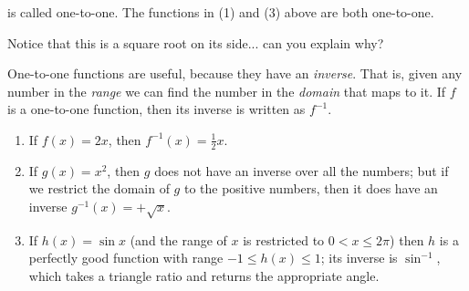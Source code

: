\begin{ex}
\begin{enumerate}
          is called one-to-one. The functions in (1) and (3) above are both one-to-one.
          \begin{center}
          \end{center}
          Notice that this is a square root on its side... can you explain why?
  \end{enumerate}
\end{ex}

One-to-one functions are useful, because they have an \emph{inverse}. That is, given any number in the \emph{range} we can find
the number in the \emph{domain} that maps to it. If $ f $ is a one-to-one function, then its inverse is written as $ f^{-1} $.

\begin{ex}\leavevmode
  \begin{enumerate}
    \item If $ f(x) = 2x $, then $ f^{-1}(x) = \frac{1}{2} x $.
    \item If $ g(x) = x^2 $, then $ g $ does not have an inverse over all the numbers; but if we restrict the domain of $ g $ to
          the positive numbers, then it does have an inverse $ g^{-1}(x) = +\sqrt{x} $.
    \item If $ h(x) = \sin x $ (and the range of $ x $ is restricted to $ 0 < x \leq 2\pi $) then $ h $ is a perfectly good function
          with range $ -1 \leq h(x) \leq 1 $; its inverse is $ \sin^{-1} $, which takes a triangle ratio and returns the appropriate angle.
  \end{enumerate}
\end{ex}

